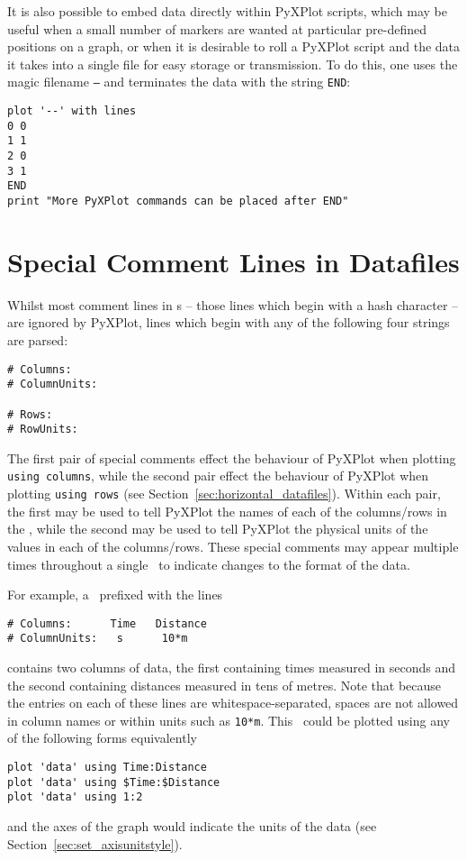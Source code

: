 It is also possible to embed data directly within PyXPlot scripts, which may be
useful when a small number of markers are wanted at particular pre-defined
positions on a graph, or when it is desirable to roll a PyXPlot script and the
data it takes into a single file for easy storage or transmission. To do this,
one uses the magic filename {\tt --} and terminates the data with the string
{\tt END}:

\begin{verbatim}
plot '--' with lines
0 0
1 1
2 0
3 1
END
print "More PyXPlot commands can be placed after END"
\end{verbatim}

\section{Special Comment Lines in Datafiles}
\label{sec:special_comments}

Whilst most comment lines in \datafile s -- those lines which begin with a hash
character -- are ignored by PyXPlot, lines which begin with any of the
following four strings are parsed:
\begin{verbatim}
# Columns:
# ColumnUnits:

# Rows:
# RowUnits:
\end{verbatim}
The first pair of special comments effect the behaviour of PyXPlot when
plotting {\tt using columns}, while the second pair effect the behaviour of
PyXPlot when plotting {\tt using rows} (see
Section~\ref{sec:horizontal_datafiles}). Within each pair, the first may be
used to tell PyXPlot the names of each of the columns/rows in the \datafile,
while the second may be used to tell PyXPlot the physical units of the values
in each of the columns/rows. These special comments may appear multiple times
throughout a single \datafile\ to indicate changes to the format of the data.

For example, a \datafile\ prefixed with the lines
\begin{verbatim}
# Columns:      Time   Distance
# ColumnUnits:   s      10*m
\end{verbatim}
contains two columns of data, the first containing times measured in seconds
and the second containing distances measured in tens of metres. Note that
because the entries on each of these lines are whitespace-separated, spaces are
not allowed in column names or within units such as {\tt 10*m}. This \datafile\
could be plotted using any of the following forms equivalently
\begin{verbatim}
plot 'data' using Time:Distance
plot 'data' using $Time:$Distance
plot 'data' using 1:2
\end{verbatim}
and the axes of the graph would indicate the units of the data (see
Section~\ref{sec:set_axisunitstyle}).

